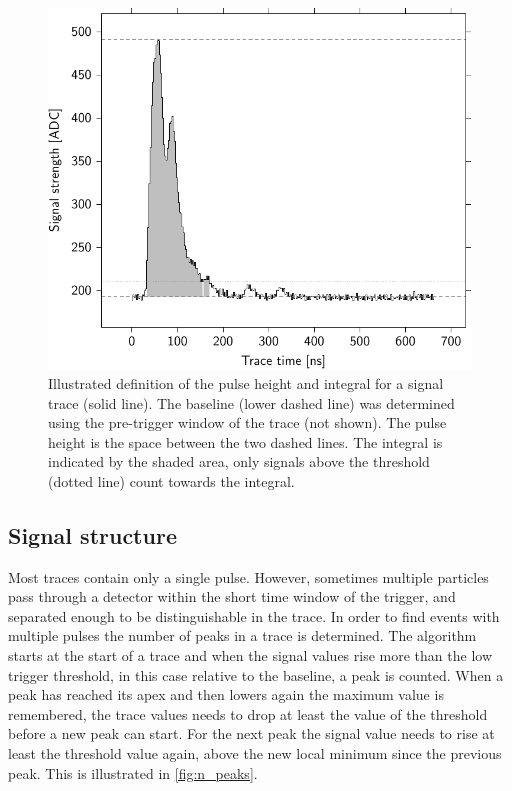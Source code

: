 \begin{figure}
    \centering
    \includegraphics[width=0.7\linewidth]{plots/processing/integral}
    \caption{Illustrated definition of the pulse height and integral for a signal trace (solid line). The baseline (lower dashed line) was determined using the pre-trigger window of the trace (not shown). The pulse height is the space between the two dashed lines. The integral is indicated by the shaded area, only signals above the threshold (dotted line) count towards the integral.}
    \label{fig:integral}
\end{figure}


\subsection{Signal structure}

Most traces contain only a single pulse. However, sometimes multiple particles pass through a detector within the short time window of the trigger, and separated enough to be distinguishable in the trace. In order to find events with multiple pulses the number of peaks in a trace is determined. The algorithm starts at the start of a trace and when the signal values rise more than the low trigger threshold, in this case relative to the baseline, a peak is counted. When a peak has reached its apex and then lowers again the maximum value is remembered, the trace values needs to drop at least the value of the threshold before a new peak can start. For the next peak the signal value needs to rise at least the threshold value again, above the new local minimum since the previous peak. This is illustrated in \cref{fig:n_peaks}.

